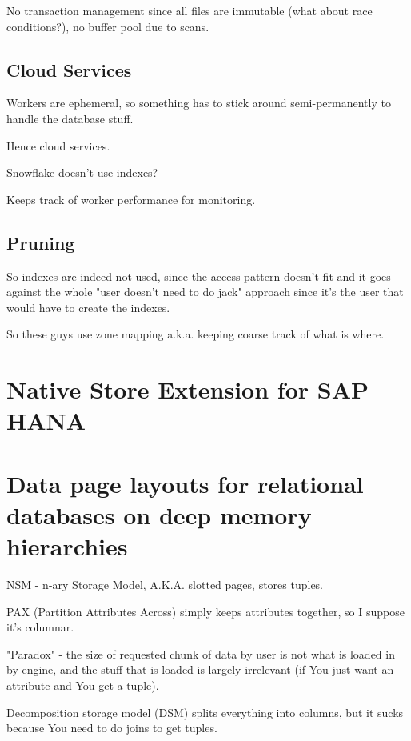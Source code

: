 \documentclass{article}
\begin{document}
		No transaction management since all files are immutable (what about race conditions?), no buffer pool due to scans.
	
	\subsection{Cloud Services}
	
		Workers are ephemeral, so something has to stick around semi-permanently to handle the database stuff.
		
		Hence cloud services.
		
		Snowflake doesn't use indexes? 
		
		Keeps track of worker performance for monitoring.
		
	\subsection{Pruning}
	
		So indexes are indeed not used, since the access pattern doesn't fit and it goes against the whole "user doesn't need to do jack" approach since it's the user that would have to create the indexes.
		
		So these guys use zone mapping a.k.a. keeping coarse track of what is where.
	
	
\newpage
\section{Native Store Extension for SAP HANA}

	
			
\newpage
\section{Data page layouts for relational databases on deep memory hierarchies}

	NSM - n-ary Storage Model, A.K.A. slotted pages, stores tuples.
	
	PAX (Partition Attributes Across) simply keeps attributes together, so I suppose it's columnar.
	
	"Paradox" - the size of requested chunk of data by user is not what is loaded in by engine, and the stuff that is loaded is largely irrelevant (if You just want an attribute and You get a tuple).
	
	Decomposition storage model (DSM) splits everything into columns, but it sucks because You need to do joins to get tuples.
	
\end{document}

